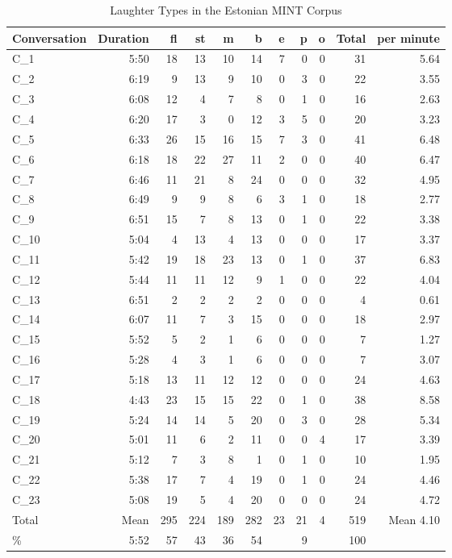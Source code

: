\documentclass[10pt,journal,compsoc]{IEEEtran}
\begin{document}
\begin{table}[!t]
\caption{Laughter Types in the Estonian MINT Corpus}
\label{tab:laughter-estonian}
\centering
\begin{tabular}{| l | r | r r | r r r r r | r | r |}
\hline
Conversation & Duration & fl  & st & m & b & e & p & o & Total & per minute \\
\hline
C\_1 & 5:50 & 18 & 13 & 10 & 14 & 7 & 0 & 0 & 31 & 5.64 \\
C\_2 & 6:19 &  9 & 13 &  9 & 10 & 0 & 3 & 0 & 22 & 3.55 \\
C\_3 & 6:08 & 12 &  4 &  7 &  8 & 0 & 1 & 0 & 16 & 2.63 \\
C\_4 & 6:20 & 17 &  3 &  0 & 12 & 3 & 5 & 0 & 20 & 3.23 \\
C\_5 & 6:33 & 26 & 15 & 16 & 15 & 7 & 3 & 0 & 41 & 6.48 \\
C\_6 & 6:18 & 18 & 22 & 27 & 11 & 2 & 0 & 0 & 40 & 6.47 \\
C\_7 & 6:46 & 11 & 21 &  8 & 24 & 0 & 0 & 0 & 32 & 4.95 \\
C\_8 & 6:49 &  9 &  9 &  8 &  6 & 3 & 1 & 0 & 18 & 2.77 \\
C\_9 & 6:51 & 15 &  7 &  8 & 13 & 0 & 1 & 0 & 22 & 3.38 \\
C\_10 & 5:04 & 4 & 13 &  4 & 13 & 0 & 0 & 0 & 17 & 3.37 \\
C\_11 & 5:42 & 19 & 18 & 23 & 13 & 0 & 1 & 0 & 37 & 6.83 \\
C\_12 & 5:44 & 11 & 11 & 12 &  9 & 1 & 0 & 0 & 22 & 4.04 \\
C\_13 & 6:51 &  2 &  2 &  2 &  2 & 0 & 0 & 0 &  4 & 0.61 \\
C\_14 & 6:07 & 11 &  7 &  3 & 15 & 0 & 0 & 0 & 18 & 2.97 \\
C\_15 & 5:52 &  5 &  2 &  1 &  6 & 0 & 0 & 0 &  7 & 1.27 \\
C\_16 & 5:28 &  4 &  3 &  1 &  6 & 0 & 0 & 0 &  7 & 3.07 \\
C\_17 & 5:18 & 13 & 11 & 12 & 12 & 0 & 0 & 0 & 24 & 4.63 \\
C\_18 & 4:43 & 23 & 15 & 15 & 22 & 0 & 1 & 0 & 38 & 8.58 \\
C\_19 & 5:24 & 14 & 14 &  5 & 20 & 0 & 3 & 0 & 28 & 5.34 \\
C\_20 & 5:01 & 11 &  6 &  2 & 11 & 0 & 0 & 4 & 17 & 3.39 \\
C\_21 & 5:12 &  7 &  3 &  8 &  1 & 0 & 1 & 0 & 10 & 1.95 \\
C\_22 & 5:38 & 17 &  7 &  4 & 19 & 0 & 1 & 0 & 24 & 4.46 \\
C\_23 & 5:08 & 19 &  5 &  4 & 20 & 0 & 0 & 0 & 24 & 4.72 \\
\hline
Total & Mean  & 295 & 224 & 189 & 282 & 23 & 21 & 4 & 519 & Mean 4.10 \\
 \%   & 5:52 &  57 &  43 &  36 &  54 & &  9 &	& 100 & \\
\hline
\end{tabular}
\end{table}
\end{document}
